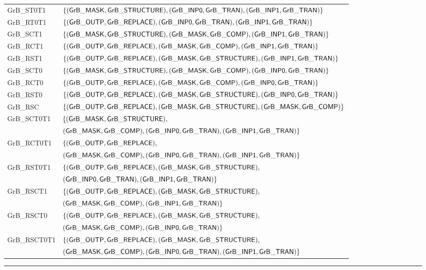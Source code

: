 \begin{table}[htbp]
\begin{center}
\begin{small}
\begin{tabular}{l|l}
		{\sf GrB\_ST0T1}	& $\{ ({\sf GrB\_MASK},{\sf GrB\_STRUCTURE}),({\sf GrB\_INP0},{\sf GrB\_TRAN}),({\sf GrB\_INP1},{\sf GrB\_TRAN})    \}$       \\
		{\sf GrB\_RT0T1}	& $\{ ({\sf GrB\_OUTP},{\sf GrB\_REPLACE})  ,({\sf GrB\_INP0},{\sf GrB\_TRAN}),({\sf GrB\_INP1},{\sf GrB\_TRAN})    \}$    	\\
		{\sf GrB\_SCT1}		& $\{ ({\sf GrB\_MASK},{\sf GrB\_STRUCTURE}),({\sf GrB\_MASK},{\sf GrB\_COMP}),({\sf GrB\_INP1},{\sf GrB\_TRAN})      \}$	\\
		{\sf GrB\_RCT1}		& $\{ ({\sf GrB\_OUTP},{\sf GrB\_REPLACE})  ,({\sf GrB\_MASK},{\sf GrB\_COMP}),({\sf GrB\_INP1},{\sf GrB\_TRAN})      \}$	\\
		{\sf GrB\_RST1}		& $\{ ({\sf GrB\_OUTP},{\sf GrB\_REPLACE})  ,({\sf GrB\_MASK},{\sf GrB\_STRUCTURE}),({\sf GrB\_INP1},{\sf GrB\_TRAN}) \}$	\\
		{\sf GrB\_SCT0}		& $\{ ({\sf GrB\_MASK},{\sf GrB\_STRUCTURE}),({\sf GrB\_MASK},{\sf GrB\_COMP}),({\sf GrB\_INP0},{\sf GrB\_TRAN})      \}$	\\
		{\sf GrB\_RCT0}		& $\{ ({\sf GrB\_OUTP},{\sf GrB\_REPLACE})  ,({\sf GrB\_MASK},{\sf GrB\_COMP}),({\sf GrB\_INP0},{\sf GrB\_TRAN})      \}$	\\
		{\sf GrB\_RST0}		& $\{ ({\sf GrB\_OUTP},{\sf GrB\_REPLACE})  ,({\sf GrB\_MASK},{\sf GrB\_STRUCTURE}),({\sf GrB\_INP0},{\sf GrB\_TRAN}) \}$	\\
		{\sf GrB\_RSC}		& $\{ ({\sf GrB\_OUTP},{\sf GrB\_REPLACE})  , ({\sf GrB\_MASK},{\sf GrB\_STRUCTURE}), ({\sf GrB\_MASK},{\sf GrB\_COMP}) \}$	\\
		{\sf GrB\_SCT0T1}	& $\{ ({\sf GrB\_MASK},{\sf GrB\_STRUCTURE}),                                                 $ 	\\
					& $   ({\sf GrB\_MASK},{\sf GrB\_COMP})     , ({\sf GrB\_INP0},{\sf GrB\_TRAN}), ({\sf GrB\_INP1},{\sf GrB\_TRAN})  \}$ 	\\
		{\sf GrB\_RCT0T1}	& $\{ ({\sf GrB\_OUTP},{\sf GrB\_REPLACE})  ,                                                 $ 	\\
					& $   ({\sf GrB\_MASK},{\sf GrB\_COMP})     , ({\sf GrB\_INP0},{\sf GrB\_TRAN}), ({\sf GrB\_INP1},{\sf GrB\_TRAN})  \}$ 	\\
		{\sf GrB\_RST0T1}	& $\{ ({\sf GrB\_OUTP},{\sf GrB\_REPLACE})  , ({\sf GrB\_MASK},{\sf GrB\_STRUCTURE}),                       $ 	\\
					& $   ({\sf GrB\_INP0},{\sf GrB\_TRAN})   , ({\sf GrB\_INP1},{\sf GrB\_TRAN})                         \}$	\\
		{\sf GrB\_RSCT1}	& $\{ ({\sf GrB\_OUTP},{\sf GrB\_REPLACE})  , ({\sf GrB\_MASK},{\sf GrB\_STRUCTURE}),                       $	\\
					& $   ({\sf GrB\_MASK},{\sf GrB\_COMP})     , ({\sf GrB\_INP1},{\sf GrB\_TRAN})                         \}$	\\
		{\sf GrB\_RSCT0}	& $\{ ({\sf GrB\_OUTP},{\sf GrB\_REPLACE})  , ({\sf GrB\_MASK},{\sf GrB\_STRUCTURE}),                       $ 	\\
					& $   ({\sf GrB\_MASK},{\sf GrB\_COMP})     , ({\sf GrB\_INP0},{\sf GrB\_TRAN})                         \}$	\\
		{\sf GrB\_RSCT0T1}	& $\{ ({\sf GrB\_OUTP},{\sf GrB\_REPLACE})  , ({\sf GrB\_MASK},{\sf GrB\_STRUCTURE}),		        $	\\
					& $   ({\sf GrB\_MASK},{\sf GrB\_COMP})     , ({\sf GrB\_INP0},{\sf GrB\_TRAN}), ({\sf GrB\_INP1},{\sf GrB\_TRAN})  \}$ 	\\
	    \end{tabular}
	\end{small}

    \end{center}
    \hrule
\end{table}


